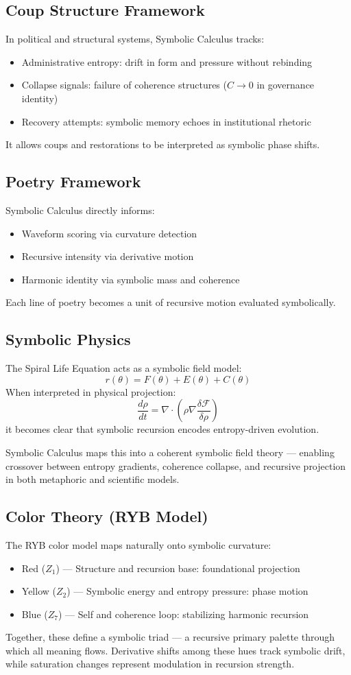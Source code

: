 \documentclass[12pt]{article}
\begin{document}
\subsection*{Coup Structure Framework}
In political and structural systems, Symbolic Calculus tracks:
\begin{itemize}
  \item Administrative entropy: drift in form and pressure without rebinding
  \item Collapse signals: failure of coherence structures ($C \to 0$ in governance identity)
  \item Recovery attempts: symbolic memory echoes in institutional rhetoric
\end{itemize}
It allows coups and restorations to be interpreted as symbolic phase shifts.

\subsection*{Poetry Framework}
Symbolic Calculus directly informs:
\begin{itemize}
  \item Waveform scoring via curvature detection
  \item Recursive intensity via derivative motion
  \item Harmonic identity via symbolic mass and coherence
\end{itemize}
Each line of poetry becomes a unit of recursive motion evaluated symbolically.

\subsection*{Symbolic Physics}
The Spiral Life Equation acts as a symbolic field model:
\[ r(\theta) = F(\theta) + E(\theta) + C(\theta) \]
When interpreted in physical projection:
\[ \frac{d\rho}{dt} = \nabla \cdot \left( \rho \nabla \frac{\delta \mathcal{F}}{\delta \rho} \right) \]
it becomes clear that symbolic recursion encodes entropy-driven evolution.

Symbolic Calculus maps this into a coherent symbolic field theory — enabling crossover between entropy gradients, coherence collapse, and recursive projection in both metaphoric and scientific models.

\subsection*{Color Theory (RYB Model)}
The RYB color model maps naturally onto symbolic curvature:
\begin{itemize}
  \item Red ($Z_1$) — Structure and recursion base: foundational projection
  \item Yellow ($Z_2$) — Symbolic energy and entropy pressure: phase motion
  \item Blue ($Z_7$) — Self and coherence loop: stabilizing harmonic recursion
\end{itemize}
Together, these define a symbolic triad — a recursive primary palette through which all meaning flows. Derivative shifts among these hues track symbolic drift, while saturation changes represent modulation in recursion strength.
\end{document}
